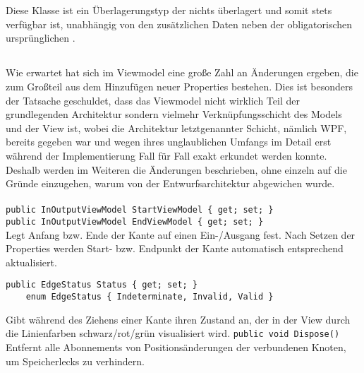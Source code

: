 \paragraph{}~\\
Diese Klasse ist ein Überlagerungstyp der nichts überlagert und somit stets verfügbar ist, unabhängig von den zusätzlichen Daten neben der obligatorischen ursprünglichen .

\subsection{}

Wie erwartet hat sich im Viewmodel eine große Zahl an Änderungen ergeben, die zum Großteil aus dem Hinzufügen neuer Properties bestehen. Dies ist besonders der Tatsache geschuldet, dass das Viewmodel nicht wirklich Teil der grundlegenden Architektur sondern vielmehr Verknüpfungsschicht des Models und der View ist, wobei die Architektur letztgenannter Schicht, nämlich WPF, bereits gegeben war und wegen ihres unglaublichen Umfangs im Detail erst während der Implementierung Fall für Fall exakt erkundet werden konnte. Deshalb werden im Weiteren die Änderungen beschrieben, ohne einzeln auf die Gründe einzugehen, warum von der Entwurfsarchitektur abgewichen wurde.

\paragraph{}
\begin{itemize}
	\add \verb!public InOutputViewModel StartViewModel { get; set; }! \\
	     \verb!public InOutputViewModel EndViewModel { get; set; }! \\
	Legt Anfang bzw. Ende der Kante auf einen Ein-/Ausgang fest. Nach Setzen der Properties werden Start- bzw. Endpunkt der Kante automatisch entsprechend aktualisiert.
	\add \begin{verbatim}public EdgeStatus Status { get; set; }
	enum EdgeStatus { Indeterminate, Invalid, Valid }
	\end{verbatim}
	Gibt während des Ziehens einer Kante ihren Zustand an, der in der View durch die Linienfarben schwarz/rot/grün visualisiert wird.
	\add \verb!public void Dispose()! \\
	Entfernt alle Abonnements von Positionsänderungen der verbundenen Knoten, um Speicherlecks zu verhindern.
\end{itemize}

